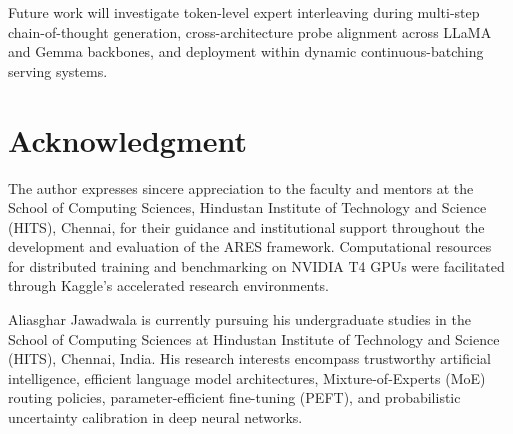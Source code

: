 \documentclass[journal,10pt,twocolumn]{IEEEtran}
\begin{document}
Future work will investigate token-level expert interleaving during multi-step chain-of-thought generation, cross-architecture probe alignment across LLaMA and Gemma backbones, and deployment within dynamic continuous-batching serving systems.

\section*{Acknowledgment}
The author expresses sincere appreciation to the faculty and mentors at the School of Computing Sciences, Hindustan Institute of Technology and Science (HITS), Chennai, for their guidance and institutional support throughout the development and evaluation of the ARES framework. Computational resources for distributed training and benchmarking on NVIDIA T4 GPUs were facilitated through Kaggle's accelerated research environments.

\balance



\begin{IEEEbiographynophoto}{Aliasghar Jawadwala}
is currently pursuing his undergraduate studies in the School of Computing Sciences at Hindustan Institute of Technology and Science (HITS), Chennai, India. His research interests encompass trustworthy artificial intelligence, efficient language model architectures, Mixture-of-Experts (MoE) routing policies, parameter-efficient fine-tuning (PEFT), and probabilistic uncertainty calibration in deep neural networks.
\end{IEEEbiographynophoto}
\vfill
\end{document}
